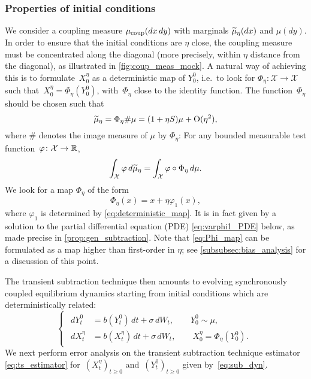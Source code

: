 \subsubsection{Properties of initial conditions}
\label{subsubsec:properties_init_cond}
%
We consider a coupling measure $\mu_{\rm coup}(dx \, dy)$ with marginals $\widetilde{\mu}_\eta(dx)$ and $\mu(dy)$. In order to ensure that the initial conditions are $\eta$ close, the coupling measure must be concentrated along the diagonal (more precisely, within $\eta$ distance from the diagonal), as illustrated in \cref{fig:coup_meas_mock}. A natural way of achieving this is to formulate~$X_0^\eta$ as a deterministic map of $Y_0^0$, i.e.\ to look for $\Phi_\eta \colon \mathcal{X} \to \mathcal{X}$ such that~$X_0^\eta = \Phi_\eta(Y_0^0)$, with~$\Phi_\eta$ close to the identity function. The function~$\Phi_\eta$ should be chosen such that
%
\begin{equation}
	\widetilde{\mu}_\eta = \Phi_\eta \# \mu = (1+\eta S)\mu + \mathrm{O}(\eta^2),
	\label{eq:deterministic_map}
\end{equation}
%
where $\#$ denotes the image measure of $\mu$ by $\Phi_\eta$: For any bounded measurable test function~$\varphi\colon \mathcal{X} \to \mathbb{R}$,
%
\begin{equation}
	\int_\mathcal{X} \varphi \, d\widetilde{\mu}_\eta = \int_\mathcal{X} \varphi \circ \Phi_\eta \, d\mu.
\end{equation}
%
We look for a map $\Phi_\eta$ of the form
%
\begin{equation}
	\Phi_\eta(x) = x + \eta\varphi_1(x),
	\label{eq:Phi_map}
\end{equation}
%
where $\varphi_1$ is determined by \eqref{eq:deterministic_map}. It is in fact given by a solution to the partial differential equation (PDE) \eqref{eq:varphi1_PDE} below, as made precise in \cref{prop:gen_subtraction}.
%
Note that \eqref{eq:Phi_map} can be formulated as a map higher than first-order in $\eta$; see \cref{subsubsec:bias_analysis} for a discussion of this point.

The transient subtraction technique then amounts to evolving synchronously coupled equilibrium dynamics starting from initial conditions which are deterministically related:
%
\begin{equation}
\begin{cases}
\begin{aligned}
	dY_t^0 &= b(Y_t^0) \, dt + \sigma \, dW_t, \qquad Y_0^0 \sim \mu, \\
	dX_t^\eta &= b(X_t^\eta) \, dt + \sigma \, dW_t, \qquad X_0^\eta = \Phi_\eta(Y_0^0).
\end{aligned}
\end{cases}
\label{eq:sub_dyn}
\end{equation}
%
We next perform error analysis on the transient subtraction technique estimator \eqref{eq:ts_estimator} for~$(X_t^\eta)_{t\geq 0}$ and~$(Y_t^0)_{t\geq 0}$ given by~\eqref{eq:sub_dyn}.
 
